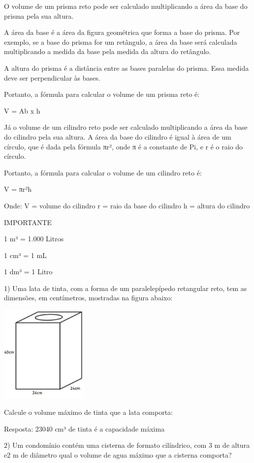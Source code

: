 O volume de um prisma reto pode ser calculado multiplicando a área da
base do prisma pela sua altura.

A área da base é a área da figura geométrica que forma a base do prisma.
Por exemplo, se a base do prisma for um retângulo, a área da base será
calculada multiplicando a medida da base pela medida da altura do
retângulo.

A altura do prisma é a distância entre as bases paralelas do prisma.
Essa medida deve ser perpendicular às bases.

Portanto, a fórmula para calcular o volume de um prisma reto é:

V = Ab x h

Já o volume de um cilindro reto pode ser calculado multiplicando a área
da base do cilindro pela sua altura. A área da base do cilindro é igual
à área de um círculo, que é dada pela fórmula πr², onde π é a constante
de Pi, e r é o raio do círculo.

Portanto, a fórmula para calcular o volume de um cilindro reto é:

V = πr²h

Onde: V = volume do cilindro r = raio da base do cilindro h = altura do
cilindro

IMPORTANTE

1 m³ = 1.000 Litros

1 cm³ = 1 mL

1 dm³ = 1 Litro


1) Uma lata de tinta, com a forma de um paralelepípedo retangular reto,
tem as dimensões, em centímetros, mostradas na figura abaixo:

\includegraphics[width=1.69792in,height=1.88115in]{./imgSAEB_6_MAT/media/image95.png}

Calcule o volume máximo de tinta que a lata comporta:

Resposta: 23040 cm³ de tinta é a capacidade máxima

2) Um condomínio contém uma cisterna de formato cilíndrico, com 3 m de
altura e2 m de diâmetro qual o volume de agua máximo que a cisterna
comporta?


